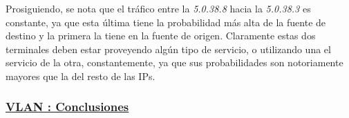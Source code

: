 \par Prosiguiendo, se nota que el tr\'afico entre la \textit{5.0.38.8} hacia
la \textit{5.0.38.3} es constante, ya que esta \'ultima tiene la probabilidad
m\'as alta de la fuente de destino y la primera la tiene en la fuente de origen. Claramente
estas dos terminales deben estar proveyendo alg\'un tipo de servicio, o utilizando
una el servicio de la otra, constantemente, ya que sus probabilidades son
notoriamente mayores que la del resto de las IPs.

\subsubsection*{\underline{VLAN : Conclusiones}}\label{subsubsec:vlan20_conclusiones}
